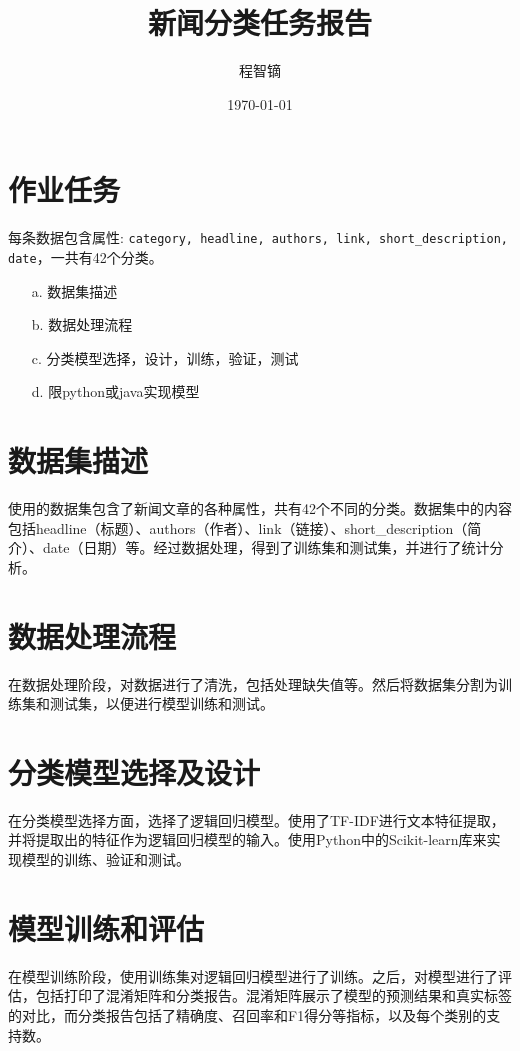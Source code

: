 \documentclass{article}
\title{新闻分类任务报告}
\author{程智镝}
\date{\today}
\begin{document}
\maketitle

\section*{作业任务}

每条数据包含属性: \texttt{category, headline, authors, link, short\_description, date}，一共有42个分类。

\begin{itemize}
    \item[a.] 数据集描述
    \item[b.] 数据处理流程
    \item[c.] 分类模型选择，设计，训练，验证，测试
    \item[d.] 限python或java实现模型
\end{itemize}

\section{数据集描述}
使用的数据集包含了新闻文章的各种属性，共有42个不同的分类。数据集中的内容包括headline（标题）、authors（作者）、link（链接）、short\_description（简介）、date（日期）等。经过数据处理，得到了训练集和测试集，并进行了统计分析。

\section{数据处理流程}
在数据处理阶段，对数据进行了清洗，包括处理缺失值等。然后将数据集分割为训练集和测试集，以便进行模型训练和测试。

\section{分类模型选择及设计}
在分类模型选择方面，选择了逻辑回归模型。使用了TF-IDF进行文本特征提取，并将提取出的特征作为逻辑回归模型的输入。使用Python中的Scikit-learn库来实现模型的训练、验证和测试。

\section{模型训练和评估}
在模型训练阶段，使用训练集对逻辑回归模型进行了训练。之后，对模型进行了评估，包括打印了混淆矩阵和分类报告。混淆矩阵展示了模型的预测结果和真实标签的对比，而分类报告包括了精确度、召回率和F1得分等指标，以及每个类别的支持数。
\end{document}
